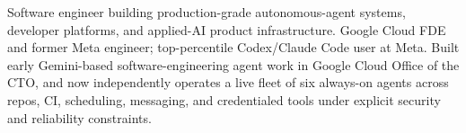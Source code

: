 


Software engineer building production-grade autonomous-agent systems, developer platforms, and applied-AI product infrastructure. Google Cloud FDE and former Meta engineer; top-percentile Codex/Claude Code user at Meta. Built early Gemini-based software-engineering agent work in Google Cloud Office of the CTO, and now independently operates a live fleet of six always-on agents across repos, CI, scheduling, messaging, and credentialed tools under explicit security and reliability constraints.







